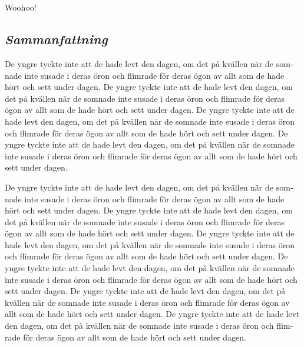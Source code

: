 \documentclass{UUThesisTemplate}
\begin{document}
\chapter{{}}
{\noteunic
Woohoo!
}
\begin{swedish}
\chapter{\emph{Sammanfattning}}
{\noteunic
\par De yngre tyckte inte att de hade levt den dagen, om det på kvällen när de somnade inte susade i deras öron och flimrade för deras ögon av allt som de hade hört och sett under dagen. De yngre tyckte inte att de hade levt den dagen, om det på kvällen när de somnade inte susade i deras öron och flimrade för deras ögon av allt som de hade hört och sett under dagen. De yngre tyckte inte att de hade levt den dagen, om det på kvällen när de somnade inte susade i deras öron och flimrade för deras ögon av allt som de hade hört och sett under dagen. De yngre tyckte inte att de hade levt den dagen, om det på kvällen när de somnade inte susade i deras öron och flimrade för deras ögon av allt som de hade hört och sett under dagen.
\par De yngre tyckte inte att de hade levt den dagen, om det på kvällen när de somnade inte susade i deras öron och flimrade för deras ögon av allt som de hade hört och sett under dagen. De yngre tyckte inte att de hade levt den dagen, om det på kvällen när de somnade inte susade i deras öron och flimrade för deras ögon av allt som de hade hört och sett under dagen. De yngre tyckte inte att de hade levt den dagen, om det på kvällen när de somnade inte susade i deras öron och flimrade för deras ögon av allt som de hade hört och sett under dagen. De yngre tyckte inte att de hade levt den dagen, om det på kvällen när de somnade inte susade i deras öron och flimrade för deras ögon av allt som de hade hört och sett under dagen. De yngre tyckte inte att de hade levt den dagen, om det på kvällen när de somnade inte susade i deras öron och flimrade för deras ögon av allt som de hade hört och sett under dagen. De yngre tyckte inte att de hade levt den dagen, om det på kvällen när de somnade inte susade i deras öron och flimrade för deras ögon av allt som de hade hört och sett under dagen.
}
\end{swedish}
\end{document}
